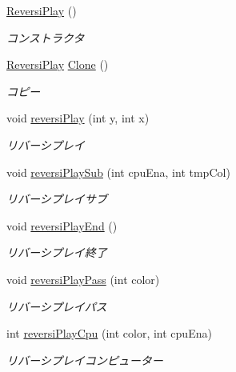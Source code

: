 \begin{DoxyCompactItemize}
\item 
\hyperlink{class_reversi4color_wpf_1_1_reversi_play_aa537cfa5793632608337be296a859474}{Reversi\+Play} ()
\begin{DoxyCompactList}\small\item\em コンストラクタ \end{DoxyCompactList}\item 
\hyperlink{class_reversi4color_wpf_1_1_reversi_play}{Reversi\+Play} \hyperlink{class_reversi4color_wpf_1_1_reversi_play_a9140ddb26faa06482d52cb9243236203}{Clone} ()
\begin{DoxyCompactList}\small\item\em コピー \end{DoxyCompactList}\item 
void \hyperlink{class_reversi4color_wpf_1_1_reversi_play_a71d9150ecdddaf5e6446430bf8658180}{reversi\+Play} (int y, int x)
\begin{DoxyCompactList}\small\item\em リバーシプレイ \end{DoxyCompactList}\item 
void \hyperlink{class_reversi4color_wpf_1_1_reversi_play_a44bb5fb6cfa685baef758a8129bd9d36}{reversi\+Play\+Sub} (int cpu\+Ena, int tmp\+Col)
\begin{DoxyCompactList}\small\item\em リバーシプレイサブ \end{DoxyCompactList}\item 
void \hyperlink{class_reversi4color_wpf_1_1_reversi_play_a870220856af57a48fc1527e59a552171}{reversi\+Play\+End} ()
\begin{DoxyCompactList}\small\item\em リバーシプレイ終了 \end{DoxyCompactList}\item 
void \hyperlink{class_reversi4color_wpf_1_1_reversi_play_ab33ac6590dea7b86e1fcc0d011353564}{reversi\+Play\+Pass} (int color)
\begin{DoxyCompactList}\small\item\em リバーシプレイパス \end{DoxyCompactList}\item 
int \hyperlink{class_reversi4color_wpf_1_1_reversi_play_a2c7daaca43563e35abf8e65347c65a23}{reversi\+Play\+Cpu} (int color, int cpu\+Ena)
\begin{DoxyCompactList}\small\item\em リバーシプレイコンピューター \end{DoxyCompactList}\item 

\end{DoxyCompactItemize}
